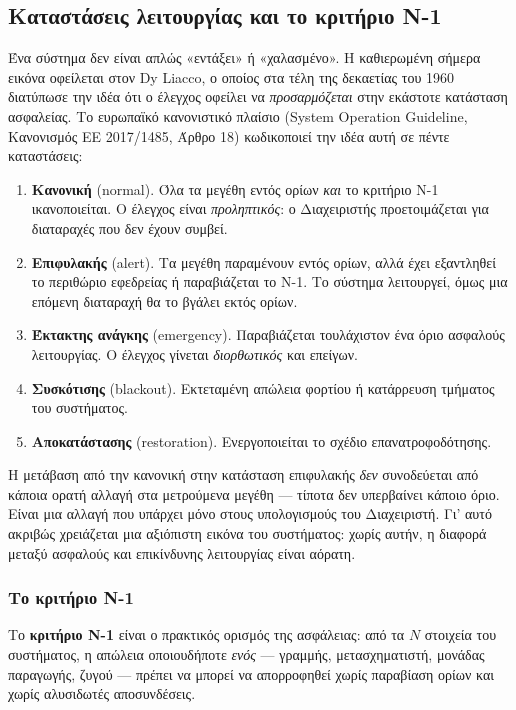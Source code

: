\subsection{Καταστάσεις λειτουργίας και το κριτήριο N-1}

Ένα σύστημα δεν είναι απλώς «εντάξει» ή «χαλασμένο». Η καθιερωμένη σήμερα εικόνα οφείλεται
στον Dy Liacco, ο οποίος στα τέλη της δεκαετίας του 1960 διατύπωσε την ιδέα ότι ο έλεγχος
οφείλει να \emph{προσαρμόζεται} στην εκάστοτε κατάσταση ασφαλείας. Το ευρωπαϊκό κανονιστικό
πλαίσιο (System Operation Guideline, Κανονισμός ΕΕ 2017/1485, Άρθρο 18) κωδικοποιεί την
ιδέα αυτή σε πέντε καταστάσεις:

\begin{enumerate}
\item \textbf{Κανονική} (normal). Όλα τα μεγέθη εντός ορίων \emph{και} το κριτήριο N-1
      ικανοποιείται. Ο έλεγχος είναι \emph{προληπτικός}: ο Διαχειριστής προετοιμάζεται για
      διαταραχές που δεν έχουν συμβεί.
\item \textbf{Επιφυλακής} (alert). Τα μεγέθη παραμένουν εντός ορίων, αλλά έχει εξαντληθεί
      το περιθώριο εφεδρείας ή παραβιάζεται το N-1. Το σύστημα λειτουργεί, όμως μια επόμενη
      διαταραχή θα το βγάλει εκτός ορίων.
\item \textbf{Έκτακτης ανάγκης} (emergency). Παραβιάζεται τουλάχιστον ένα όριο ασφαλούς
      λειτουργίας. Ο έλεγχος γίνεται \emph{διορθωτικός} και επείγων.
\item \textbf{Συσκότισης} (blackout). Εκτεταμένη απώλεια φορτίου ή κατάρρευση τμήματος
      του συστήματος.
\item \textbf{Αποκατάστασης} (restoration). Ενεργοποιείται το σχέδιο επανατροφοδότησης.
\end{enumerate}

Η μετάβαση από την κανονική στην κατάσταση επιφυλακής \emph{δεν} συνοδεύεται από κάποια
ορατή αλλαγή στα μετρούμενα μεγέθη — τίποτα δεν υπερβαίνει κάποιο όριο. Είναι μια αλλαγή
που υπάρχει μόνο στους υπολογισμούς του Διαχειριστή. Γι' αυτό ακριβώς χρειάζεται μια
αξιόπιστη εικόνα του συστήματος: χωρίς αυτήν, η διαφορά μεταξύ ασφαλούς και επικίνδυνης
λειτουργίας είναι αόρατη.

\subsubsection*{Το κριτήριο N-1}

Το \textbf{κριτήριο N-1} είναι ο πρακτικός ορισμός της ασφάλειας: από τα $N$ στοιχεία του
συστήματος, η απώλεια οποιουδήποτε \emph{ενός} — γραμμής, μετασχηματιστή, μονάδας παραγωγής,
ζυγού — πρέπει να μπορεί να απορροφηθεί χωρίς παραβίαση ορίων και χωρίς αλυσιδωτές
αποσυνδέσεις.

